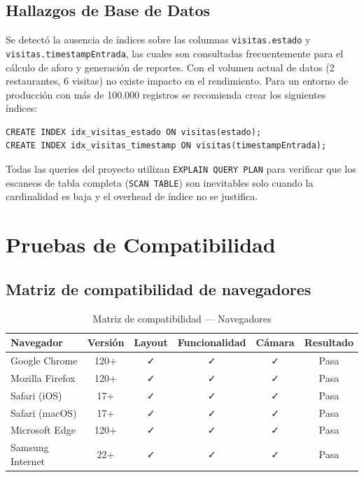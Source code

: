\subsection{Hallazgos de Base de Datos}

Se detectó la ausencia de índices sobre las columnas \texttt{visitas.estado} y \texttt{visitas.timestampEntrada}, las cuales son consultadas frecuentemente para el cálculo de aforo y generación de reportes. Con el volumen actual de datos (2 restaurantes, 6 visitas) no existe impacto en el rendimiento. Para un entorno de producción con más de 100.000 registros se recomienda crear los siguientes índices:

\begin{verbatim}
CREATE INDEX idx_visitas_estado ON visitas(estado);
CREATE INDEX idx_visitas_timestamp ON visitas(timestampEntrada);
\end{verbatim}

Todas las queries del proyecto utilizan \texttt{EXPLAIN QUERY PLAN} para verificar que los escaneos de tabla completa (\texttt{SCAN TABLE}) son inevitables solo cuando la cardinalidad es baja y el overhead de índice no se justifica.

\section{Pruebas de Compatibilidad}

\subsection{Matriz de compatibilidad de navegadores}

\begin{table}[H]
    \centering
    \caption{Matriz de compatibilidad — Navegadores}
    \label{tab:compat_navegadores}
    \small
    \begin{tabular}{|l|c|c|c|c|c|}
        \hline
        \textbf{Navegador} & \textbf{Versión} & \textbf{Layout} & \textbf{Funcionalidad} & \textbf{Cámara} & \textbf{Resultado} \\
        \hline
        Google Chrome & 120+ & ✓ & ✓ & ✓ & Pasa \\
        \hline
        Mozilla Firefox & 120+ & ✓ & ✓ & ✓ & Pasa \\
        \hline
        Safari (iOS) & 17+ & ✓ & ✓ & ✓ & Pasa \\
        \hline
        Safari (macOS) & 17+ & ✓ & ✓ & ✓ & Pasa \\
        \hline
        Microsoft Edge & 120+ & ✓ & ✓ & ✓ & Pasa \\
        \hline
        Samsung Internet & 22+ & ✓ & ✓ & ✓ & Pasa \\
        \hline
    \end{tabular}
\end{table}

